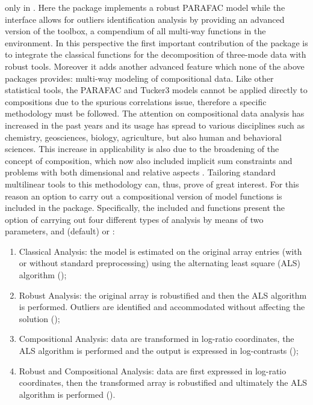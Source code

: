 \documentclass[article,shortnames, nojss]{jss}
\begin{document}
only in .
Here the  package implements a robust PARAFAC model while
the  interface allows for outliers identification analysis
by providing an advanced version of the  toolbox,
a compendium of all multi-way functions in the environment.
In this perspective the first important contribution of the
 package is to integrate the classical functions
for the decomposition of three-mode data with robust tools. Moreover it adds
another advanced feature which none of the above packages provides:
multi-way modeling of compositional data. Like other statistical tools,
the PARAFAC and Tucker3 models cannot be applied directly to compositions
due to the spurious correlations issue, therefore a specific methodology
must be followed. The attention on compositional data analysis has
increased in the past years and its usage has spread to various
disciplines such as chemistry, geosciences, biology, agriculture,
but also human and behavioral sciences. This increase in applicability
is also due to the broadening of the concept of composition, which
now also included implicit sum constraints and problems with both
dimensional and relative aspects \citep{pawlowsky2015modeling, pawlowsky2015tools}.
Tailoring standard multilinear tools to this methodology can, thus,
prove of great interest. For this reason an option to carry out a
compositional version of model functions is included in the package.
Specifically, the included  and  functions present the
option of carrying out four different types of analysis by means of
two parameters,  and 
(default) or :
\begin{enumerate}
\item Classical Analysis: the model is estimated on the original array
    entries (with or without standard preprocessing) using the alternating
    least square (ALS) algorithm ();
\item Robust Analysis: the original array is robustified and then the
    ALS algorithm is performed. Outliers are identified and accommodated
    without affecting the solution  ();
\item Compositional Analysis: data are transformed in log-ratio coordinates,
    the ALS algorithm is performed and the output is expressed in
    log-contrasts  ();
\item Robust and Compositional Analysis: data are first expressed in
    log-ratio coordinates, then the transformed array is robustified and
    ultimately the ALS algorithm is performed  ().
\end{enumerate}
\end{document}
